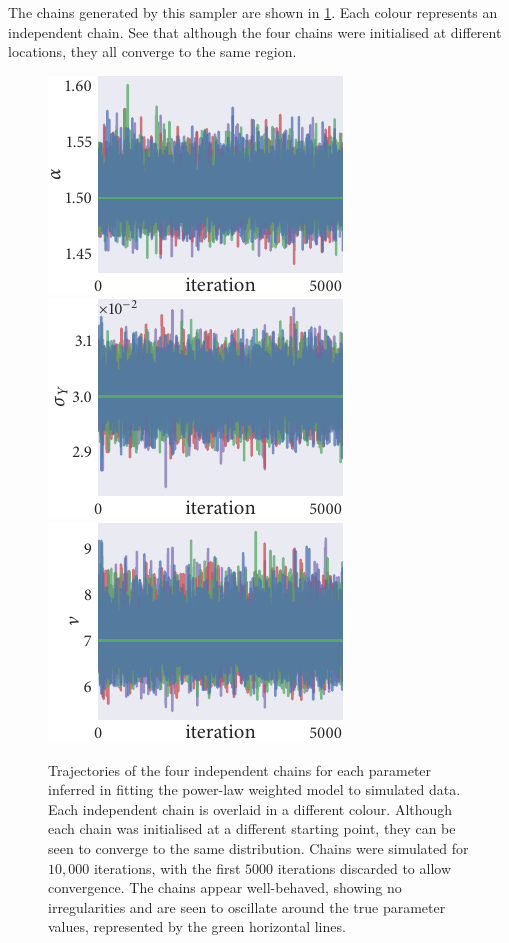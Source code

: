 The chains generated by this sampler are shown in \cref{fig:power_trace}. Each
colour represents an independent chain. See that although the four chains were
initialised at different locations, they all converge to the same region.

\begin{figure}[tbp]
  \includegraphics{power_trace_alpha.pdf}%
  \includegraphics{power_trace_sigma_Y.pdf}%
  \includegraphics{power_trace_nu.pdf}
  \caption{Trajectories of the four independent chains for each parameter
    inferred in fitting the power-law weighted model to simulated data. Each
    independent chain is overlaid in a different colour. Although each chain
    was initialised at a different starting point, they can be seen to
    converge to the same distribution. Chains were simulated for $10,000$
    iterations, with the first $5000$ iterations discarded to allow
    convergence. The chains appear well-behaved, showing no irregularities
    and are seen to oscillate around the true parameter values, represented
    by the green horizontal lines.}
  \label{fig:power_trace}
\end{figure}

